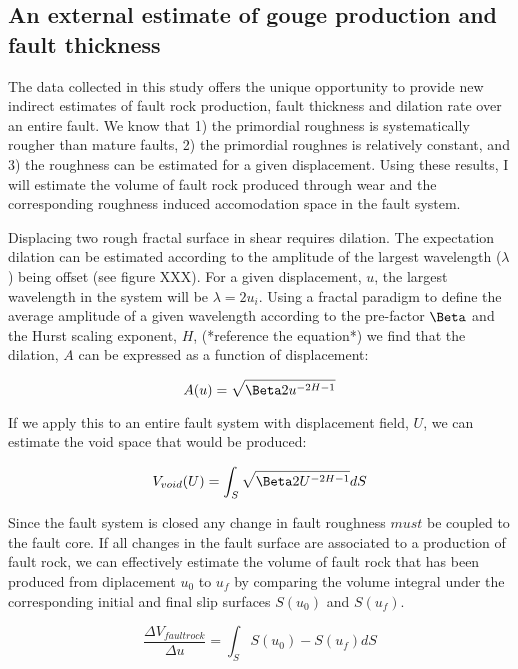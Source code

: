 \documentclass[12pt,a4paper]{article}
\begin{document}
\begin{itemize}
	\subsection{An external estimate of gouge production and fault thickness}

The data collected in this study offers the unique opportunity to provide new indirect estimates of fault rock production, fault thickness and dilation rate over an entire fault. We know that 1) the primordial roughness is systematically rougher than mature faults, 2) the primordial roughnes is relatively constant, and 3) the roughness can be estimated for a given displacement. Using these results, I will estimate the volume of fault rock produced through wear and the corresponding roughness induced accomodation space in the fault system.

Displacing two rough fractal surface in shear requires dilation. The expectation dilation can be estimated according to the amplitude of the largest wavelength ($\lambda$) being offset (see figure XXX). For a given displacement, $u$, the largest wavelength in the system will be $\lambda = 2u_i$. Using a fractal paradigm to define the average amplitude of a given wavelength according to the pre-factor $\Beta$ and the Hurst scaling exponent, $H$, (*reference the equation*) we find that the dilation, $A$ can be expressed as a function of displacement:

\begin{equation}
	A(u) = \sqrt{\Beta 2u^{-2H-1}}
\end{equation}

If we apply this to an entire fault system with displacement field, $U$, we can estimate the void space that would be produced:

\begin{equation}
	V_{void}(U) = \int_S \sqrt{\Beta 2U^{-2H-1}}dS
\end{equation}

Since the fault system is closed any change in fault roughness $must$ be coupled to the fault core. If all changes in the fault surface are associated to a production of fault rock, we can effectively estimate the volume of fault rock that has been produced from diplacement $u_0$ to $u_f$ by comparing the volume integral under the corresponding initial and final slip surfaces $S(u_0)$ and $S(u_f)$.

\begin{equation}
	\dfrac {\Delta V_{fault rock}}{\Delta u} = \int_S S(u_0) - S(u_f) dS
\end{equation}


\end{itemize}
\end{document}
